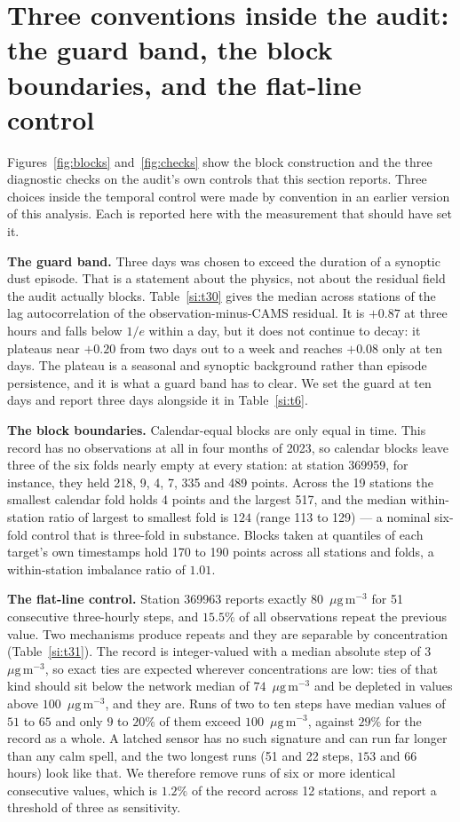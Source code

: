 \documentclass[11pt]{article}
\newcommand*{\ugm}{\ensuremath{\mu\mathrm{g\,m^{-3}}}}
\begin{document}
\section{Three conventions inside the audit: the guard band, the block boundaries, and the flat-line control}


Figures~\ref{fig:blocks} and~\ref{fig:checks} show the block construction and the three diagnostic checks on the audit's own controls that this section reports.
Three choices inside the temporal control were made by convention in an earlier version of
this analysis. Each is reported here with the measurement that should have set it.

\textbf{The guard band.} Three days was chosen to exceed the duration of a synoptic dust
episode. That is a statement about the physics, not about the residual field the audit
actually blocks. Table~\ref{si:t30} gives the median across stations of the lag autocorrelation of
the observation-minus-CAMS residual. It is $+0.87$ at three hours and falls below $1/e$
within a day, but it does not continue to decay: it plateaus near $+0.20$ from two days
out to a week and reaches $+0.08$ only at ten days. The plateau is a seasonal and synoptic
background rather than episode persistence, and it is what a guard band has to clear. We
set the guard at ten days and report three days alongside it in Table~\ref{si:t6}.

\textbf{The block boundaries.} Calendar-equal blocks are only equal in time. This record
has no observations at all in four months of 2023, so calendar blocks leave three of the
six folds nearly empty at every station: at station 369959, for instance, they held 218,
9, 4, 7, 335 and 489 points. Across the 19 stations the smallest calendar fold holds 4
points and the largest 517, and the median within-station ratio of largest to smallest
fold is $124$ (range 113 to 129) --- a nominal six-fold control that is three-fold in
substance. Blocks taken at quantiles of each target's own timestamps hold 170 to 190
points across all stations and folds, a within-station imbalance ratio of $1.01$.

\textbf{The flat-line control.} Station 369963 reports exactly $80$~\ugm{} for 51
consecutive three-hourly steps, and $15.5\%$ of all observations repeat the previous
value. Two mechanisms produce repeats and they are separable by concentration (Table~\ref{si:t31}).
The record is integer-valued with a median absolute step of $3$~\ugm{}, so exact ties are
expected wherever concentrations are low: ties of that kind should sit below the network
median of $74$~\ugm{} and be depleted in values above $100$~\ugm{}, and they are. Runs of
two to ten steps have median values of $51$ to $65$ and only $9$ to $20\%$ of them exceed
$100$~\ugm{}, against $29\%$ for the record as a whole. A latched sensor has no such
signature and can run far longer than any calm spell, and the two longest runs
(51 and 22 steps, $153$ and $66$ hours) look like that. We therefore remove runs of six or more
identical consecutive values, which is $1.2\%$ of the record across 12 stations, and
report a threshold of three as sensitivity.
\end{document}
